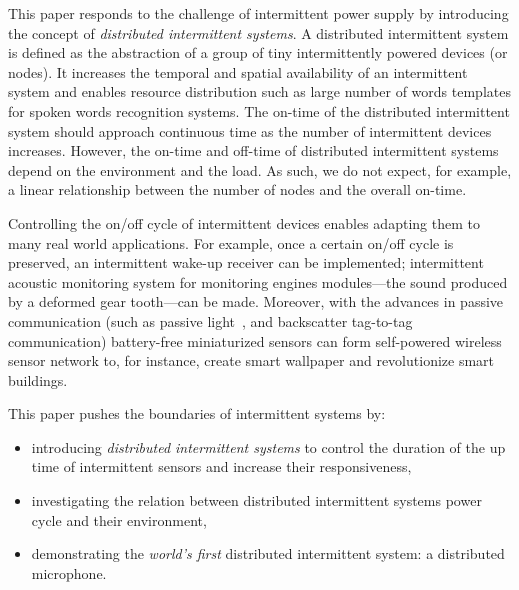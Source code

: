 %
This paper responds to the challenge of intermittent power supply by introducing the concept of \textit{distributed intermittent systems}. A distributed intermittent system is defined as the abstraction of a group of tiny intermittently powered devices (or nodes). It increases the temporal and spatial availability of an intermittent system and enables resource distribution such as large number of words templates for spoken words recognition systems. The on-time of the distributed intermittent system should approach continuous time as the number of intermittent devices increases. However, the on-time and off-time of  distributed intermittent systems depend on the environment and the load. As such, we do not expect, for example, a linear relationship between the number of nodes and the overall on-time.

Controlling the on/off cycle of intermittent devices enables adapting them to many real world applications. For example, once a certain on/off cycle is preserved, an intermittent wake-up receiver can be implemented; intermittent acoustic monitoring system for monitoring engines modules---the sound produced by a deformed gear tooth---can be made. Moreover, with the advances in passive communication (such as passive light~\cite{}, and backscatter tag-to-tag~\cite{} communication) battery-free miniaturized sensors can form self-powered wireless sensor network to, for instance, create smart wallpaper and revolutionize smart buildings. 


This paper pushes the boundaries of intermittent systems by:
\begin{itemize}
		\item introducing \textit{distributed intermittent systems} to control the duration of the up time of intermittent sensors and increase their responsiveness,
		\item investigating the relation between distributed intermittent systems power cycle and their environment,
		\item demonstrating the \textit{world's first} distributed intermittent system: a distributed microphone. 
\end{itemize}



